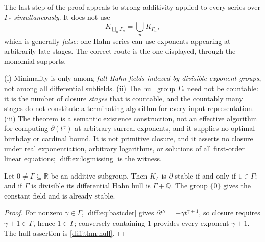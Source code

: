 \documentclass[11pt,letterpaper]{article}
\numberwithin{equation}{section}
\theoremstyle{definition}
\theoremstyle{remark}
\newcommand{\R}{\mathbb R}
\newcommand{\Q}{\mathbb Q}
\newcommand{\der}{\partial}
\begin{document}
\begin{warning}
\label{diff:warn:antilemma}
The last step of the proof appeals to strong additivity applied to every
series over $\Gamma_{*}$ \emph{simultaneously}. It does not use
\[
 K_{\bigcup_{n}\Gamma_{n}}=\bigcup_{n}K_{\Gamma_{n}},
\]
which is generally \emph{false}: one Hahn series can use exponents appearing at
arbitrarily late stages. The correct route is the one displayed, through the
monomial supports.
\end{warning}

\begin{warning}
\label{diff:warn:hulllimits}
(i) Minimality is only among \emph{full Hahn fields indexed by divisible
exponent groups}, not among all differential subfields. (ii) The hull group
$\Gamma_{*}$ need not be countable: it is the number of closure \emph{stages}
that is countable, and the countably many stages do not constitute a
terminating algorithm for every input representation. (iii) The theorem is a
semantic existence construction, not an effective algorithm for computing
$\der(t^{\gamma})$ at arbitrary surreal exponents, and it supplies no optimal
birthday or cardinal bound. It is not primitive closure, and it asserts no
closure under real exponentiation, arbitrary logarithms, or solutions of all
first-order linear equations; \cref{diff:ex:logmissing} is the witness.
\end{warning}

\begin{proposition}
\label{diff:prop:realgroup}
Let $0\neq\Gamma\subseteq\R$ be an additive subgroup. Then $K_{\Gamma}$ is
$\der$-stable if and only if $1\in\Gamma$; and if $\Gamma$ is divisible its
differential Hahn hull is $\Gamma+\Q$. The group $\{0\}$ gives the constant
field and is already stable.
\end{proposition}
\begin{proof}
For nonzero $\gamma\in\Gamma$, \cref{diff:eq:basicder} gives
$\der t^{\gamma}=-\gamma t^{\gamma+1}$, so closure requires
$\gamma+1\in\Gamma$, hence $1\in\Gamma$; conversely containing $1$ provides
every exponent $\gamma+1$. The hull assertion is \cref{diff:thm:hull}.
\end{proof}
\end{document}
